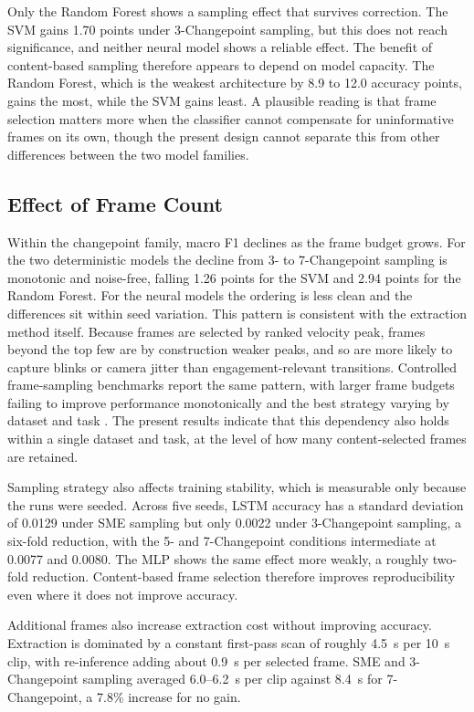 \documentclass[11pt,a4paper]{article}
\begin{document}
Only the Random Forest shows a sampling effect that survives correction. The SVM gains 1.70 points under 3-Changepoint sampling, but this does not reach significance, and neither neural model shows a reliable effect. The benefit of content-based sampling therefore appears to depend on model capacity. The Random Forest, which is the weakest architecture by 8.9 to 12.0 accuracy points, gains the most, while the SVM gains least. A plausible reading is that frame selection matters more when the classifier cannot compensate for uninformative frames on its own, though the present design cannot separate this from other differences between the two model families.

\subsection{Effect of Frame Count}

Within the changepoint family, macro F1 declines as the frame budget grows. For the two deterministic models the decline from 3- to 7-Changepoint sampling is monotonic and noise-free, falling 1.26 points for the SVM and 2.94 points for the Random Forest. For the neural models the ordering is less clean and the differences sit within seed variation. This pattern is consistent with the extraction method itself. Because frames are selected by ranked velocity peak, frames beyond the top few are by construction weaker peaks, and so are more likely to capture blinks or camera jitter than engagement-relevant transitions. Controlled frame-sampling benchmarks report the same pattern, with larger frame budgets failing to improve performance monotonically and the best strategy varying by dataset and task \citep{brkic2025}. The present results indicate that this dependency also holds within a single dataset and task, at the level of how many content-selected frames are retained.

Sampling strategy also affects training stability, which is measurable only because the runs were seeded. Across five seeds, LSTM accuracy has a standard deviation of 0.0129 under SME sampling but only 0.0022 under 3-Changepoint sampling, a six-fold reduction, with the 5- and 7-Changepoint conditions intermediate at 0.0077 and 0.0080. The MLP shows the same effect more weakly, a roughly two-fold reduction. Content-based frame selection therefore improves reproducibility even where it does not improve accuracy.

Additional frames also increase extraction cost without improving accuracy. Extraction is dominated by a constant first-pass scan of roughly 4.5~s per 10~s clip, with re-inference adding about 0.9~s per selected frame. SME and 3-Changepoint sampling averaged 6.0--6.2~s per clip against 8.4~s for 7-Changepoint, a 7.8\% increase for no gain.
\end{document}
